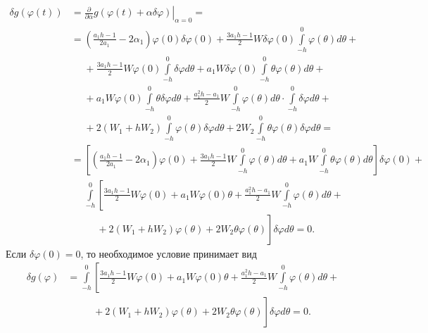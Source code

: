 \documentclass[a4paper,14pt]{article}
\begin{document}
\begin{equation*}
  \begin{aligned}
    \delta g(\varphi(t))
    &=
      {\left.
      \frac{\partial }{\partial \alpha} g(\varphi(t) + \alpha \delta \varphi)
      \right|}_{\alpha = 0} = \\
    &=
      \left(
      \frac{a_1 h - 1}{2 a_1}
      - 2 \alpha_1
      \right)
      \varphi(0)
      \delta \varphi(0)
      +
      \frac{3 a_1 h - 1}{2}
      W
      \delta \varphi(0)
      \int\limits_{-h}^{0} \varphi(\theta) d\theta + \\
    &\phantom{=}
      +
      \frac{3 a_1 h - 1}{2}
      W
      \varphi(0)
      \int\limits_{-h}^{0} \delta \varphi d\theta
      +
      a_1 W \delta \varphi(0)
      \int\limits_{-h}^{0} \theta \varphi(\theta) d\theta + \\
    &\phantom{=}
      +
      a_1 W \varphi(0)
      \int\limits_{-h}^{0} \theta \delta \varphi d\theta
      +
      \frac{a_1^2 h - a_1}{2} W
      \int\limits_{-h}^{0} \varphi(\theta) d\theta
      \cdot
      \int\limits_{-h}^{0} \delta \varphi d\theta
      + \\
    &\phantom{=}
      +
      2 \left( W_1 + h W_2 \right)
      \int\limits_{-h}^{0} \varphi(\theta)
      \delta \varphi d\theta
      +
      2 W_2
      \int\limits_{-h}^{0} \theta \varphi(\theta)
      \delta \varphi d\theta = \\
    &=
      \left[
      \left(
      \frac{a_1 h - 1}{2 a_1}
      - 2 \alpha_1
      \right)
      \varphi(0)
      +
      \frac{3 a_1 h - 1}{2}
      W
      \int\limits_{-h}^{0} \varphi(\theta) d\theta
      +
      a_1 W
      \int\limits_{-h}^{0} \theta \varphi(\theta) d\theta
      \right] \delta \varphi(0)
      + \\
    &\phantom{=}
      \int\limits_{-h}^{0}
      \left[
      \frac{3 a_1 h - 1}{2}
      W
      \varphi(0)
      +
      a_1 W \varphi(0) \theta
      +
      \frac{a_1^2 h - a_1}{2} W
      \int\limits_{-h}^{0} \varphi(\theta) d\theta
      +
      \right. \\
    &\phantom{=}
      \left.
      \phantom{\int\limits_{-h}^{0}}
      +
      2 \left( W_1 + h W_2 \right)
      \varphi(\theta)
      +
      2 W_2
      \theta \varphi(\theta)
      \right] \delta \varphi d\theta = 0.
  \end{aligned}
\end{equation*}
Если $\delta \varphi(0) = 0$, то необходимое условие принимает вид
\begin{equation*}
  \begin{aligned}
    \delta g(\varphi)
    &=
      \int\limits_{-h}^{0}
      \left[
      \frac{3 a_1 h - 1}{2}
      W
      \varphi(0)
      +
      a_1 W \varphi(0) \theta
      +
      \frac{a_1^2 h - a_1}{2} W
      \int\limits_{-h}^{0} \varphi(\theta) d\theta
      +
      \right. \\
    &\phantom{=}
      \left.
      \phantom{\int\limits_{-h}^{0}}
      +
      2 \left( W_1 + h W_2 \right)
      \varphi(\theta)
      +
      2 W_2
      \theta \varphi(\theta)
      \right] \delta \varphi d\theta = 0.
  \end{aligned}
\end{equation*}
\end{document}
